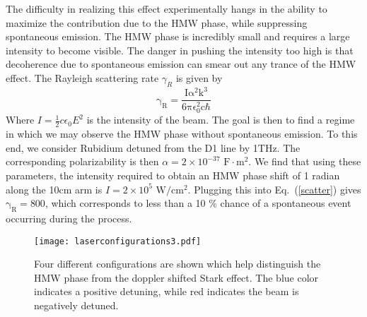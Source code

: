 \documentclass[twocolumn,english,pra,aps,superscriptaddress,floatfix]{revtex4-1}
\begin{document}
The difficulty in realizing this effect experimentally hangs in the ability to maximize the contribution due to the HMW phase, while suppressing spontaneous emission. The HMW phase is incredibly small and requires a large intensity to become visible. The danger in pushing the intensity too high is that decoherence due to spontaneous emission can smear out any trance of the HMW effect. The Rayleigh scattering rate $\gamma_{R}$ is given by
\begin{equation}
\mathrm{\gamma_{R}=\frac{I\alpha ^2 k^3}{6 \pi\epsilon_{0}^2 c\hbar}}
\label{scatter}
\end{equation}
Where $I=\frac{1}{2}c\epsilon_0 E^2$ is the intensity of the beam. The goal is then to find a regime in which we may observe the HMW phase without spontaneous emission.
To this end, we consider Rubidium detuned from the D1 line by 1THz.  The corresponding polarizability is then  $\alpha=2\times10^{-37}\, \,\mathrm{F\cdot m^2}$.  We find that using these parameters, the intensity required to obtain an HMW phase shift of 1 radian along the 10cm arm is $I=2\times 10^5 \,\, \mathrm{W/cm^2}$. Plugging this into  Eq.\ (\ref{scatter}) gives $\mathrm{\gamma_{R}}=800$, which corresponds to less than a 10 \% chance of a spontaneous event occurring during the process.
\begin{figure}
\texttt{[image: laserconfigurations3.pdf]}
\caption{Four different configurations are shown which help distinguish the HMW phase from the doppler shifted Stark effect. The blue color indicates a positive detuning, while red indicates the beam is negatively detuned.} 
\label{fig:config}
\end{figure}
 

\vspace{5mm}
\end{document}
